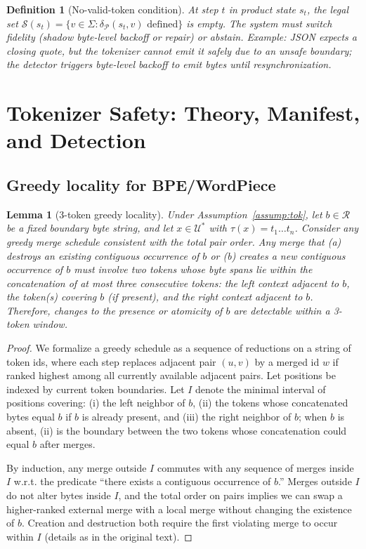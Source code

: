 \documentclass{article}
\newtheorem{lemma}{Lemma}
\newtheorem{definition}{Definition}
\begin{document}
\begin{definition}[No-valid-token condition]
At step $t$ in product state $s_t$, the legal set $\mathcal{S}(s_t)=\{v\in\Sigma:\delta_{\mathcal{P}}(s_t,v)\text{ defined}\}$ is empty. The system must switch fidelity (shadow byte-level backoff or repair) or abstain. Example: JSON expects a closing quote, but the tokenizer cannot emit it safely due to an unsafe boundary; the detector triggers byte-level backoff to emit bytes until resynchronization.
\end{definition}

\section{Tokenizer Safety: Theory, Manifest, and Detection}\label{sec:tokenizers}
\subsection{Greedy locality for BPE/WordPiece}
\begin{lemma}[3-token greedy locality]\label{lem:local}
Under Assumption~\ref{assump:tok}, let $b\in\mathcal{R}$ be a fixed boundary byte string, and let $x\in\mathcal{U}^\ast$ with $\tau(x)=t_1\dots t_n$. Consider any greedy merge schedule consistent with the total pair order. Any merge that (a) destroys an existing contiguous occurrence of $b$ or (b) creates a new contiguous occurrence of $b$ must involve two tokens whose byte spans lie within the concatenation of at most three consecutive tokens: the left context adjacent to $b$, the token(s) covering $b$ (if present), and the right context adjacent to $b$. Therefore, changes to the presence or atomicity of $b$ are detectable within a 3-token window.
\end{lemma}

\begin{proof}
We formalize a greedy schedule as a sequence of reductions on a string of token ids, where each step replaces adjacent pair $(u,v)$ by a merged id $w$ if ranked highest among all currently available adjacent pairs. Let positions be indexed by current token boundaries. Let $I$ denote the minimal interval of positions covering: (i) the left neighbor of $b$, (ii) the tokens whose concatenated bytes equal $b$ if $b$ is already present, and (iii) the right neighbor of $b$; when $b$ is absent, (ii) is the boundary between the two tokens whose concatenation could equal $b$ after merges.

By induction, any merge outside $I$ commutes with any sequence of merges inside $I$ w.r.t. the predicate “there exists a contiguous occurrence of $b$.” Merges outside $I$ do not alter bytes inside $I$, and the total order on pairs implies we can swap a higher-ranked external merge with a local merge without changing the existence of $b$. Creation and destruction both require the first violating merge to occur within $I$ (details as in the original text).
\end{proof}
\end{document}
